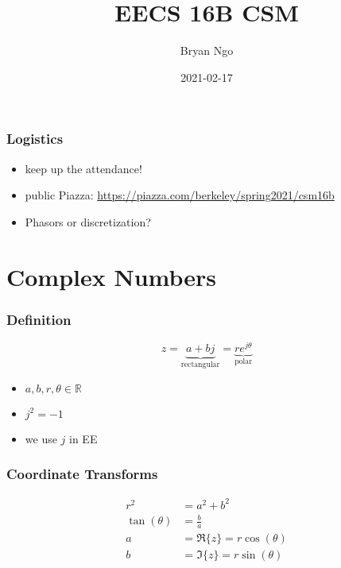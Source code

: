 \documentclass[aspectratio=169]{beamer}
\title{EECS 16B CSM}
\author{Bryan Ngo}
\date{2021-02-17}
\institute{Computer Science Mentors}
\newcommand{\R}{\mathbb{R}}
\begin{document}
\begin{frame}
    \maketitle
\end{frame}

\begin{frame}
    \frametitle{Logistics}

    \begin{itemize}
        \item keep up the attendance!
        \item public Piazza: \url{https://piazza.com/berkeley/spring2021/csm16b}
        \item Phasors or discretization?
    \end{itemize}
\end{frame}

\begin{frame}
    \tableofcontents
\end{frame}

\section{Complex Numbers}

\begin{frame}
    \frametitle{Definition}

    \begin{equation}
        z = \underbrace{a + bj}_{\text{rectangular}} = \underbrace{r e^{j \theta}}_{\text{polar}}
    \end{equation}
    \begin{itemize}
        \item \(a, b, r, \theta \in \R\)
        \item \(j^2 = -1\)
        \item we use \(j\) in EE
    \end{itemize}
\end{frame}

\begin{frame}
    \frametitle{Coordinate Transforms}

    \begin{align}
        r^2 &= a^2 + b^2 \\
        \tan(\theta) &= \frac{b}{a} \\
        a &= \Re\{z\} = r \cos(\theta) \\
        b &= \Im\{z\} = r \sin(\theta)
    \end{align}
\end{frame}
\end{document}

